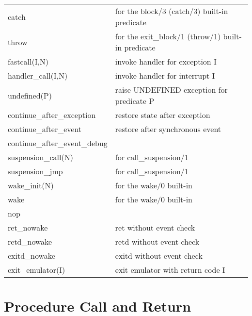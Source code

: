 \begin{tabular}{|l|p{10cm}|}
\hline
catch           & for the block/3 (catch/3) built-in predicate            \\
throw           & for the exit_block/1 (throw/1) built-in predicate       \\
\hline
fastcall(I,N)           & invoke handler for exception I          \\
handler_call(I,N)       & invoke handler for interrupt I          \\
undefined(P)            & raise UNDEFINED exception for predicate P       \\
continue_after_exception& restore state after exception           \\
\hline
continue_after_event            & restore after synchronous event       \\
continue_after_event_debug      &                                 \\
\hline
suspension_call(N)      & for call_suspension/1                   \\
suspension_jmp          & for call_suspension/1                   \\
\hline
wake_init(N)            & for the wake/0 built-in                 \\
wake                    & for the wake/0 built-in         \\
\hline
nop                     & \\
\hline
ret_nowake              & ret without event check                 \\
retd_nowake             & retd without event check                \\
exitd_nowake            & exitd without event check               \\
\hline
exit_emulator(I)        & exit emulator with return code I \\
\hline
\end{tabular}

\section{Procedure Call and Return}

